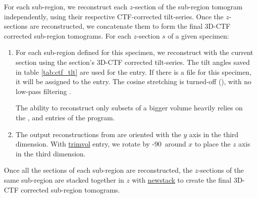 For each sub-region, we reconstruct each $z$-section of the sub-region tomogram independently, using their respective CTF-corrected tilt-series. Once the $z$-sections are reconstructed, we concatenate them to form the final 3D-CTF corrected sub-region tomograms.
For each $z$-section $s$ of a given specimen:
\begin{enumerate}
    \item For each sub-region defined for this specimen, we reconstruct with {\tilt} the current section using the section's 3D-CTF corrected tilt-series. The tilt angles saved in table \ref{tab:ctf_tlt} are used for the  entry. If there is a  file for this specimen, it will be assigned to the  entry. The cosine stretching is turned-off (), with no low-pass filtering .
    \begin{note}The ability to reconstruct only subsets of a bigger volume heavily relies on the ,  and  entries of the {\tilt} program.
    \end{note}

    \item The output reconstructions from {\tilt} are oriented with the $y$ axis in the third dimension. With \href{https://bio3d.colorado.edu/imod/doc/man/trimvol.html}{trimvol}  entry, we rotate by -90\textdegree\ around $x$ to place the $z$ axis in the third dimension.
\end{enumerate}

Once all the sections of each sub-region are reconstructed, the $z$-sections of the same sub-region are stacked together in $z$ with \href{https://bio3d.colorado.edu/imod/doc/man/newstack.html}{newstack} to create the final 3D-CTF corrected sub-region tomograms.
